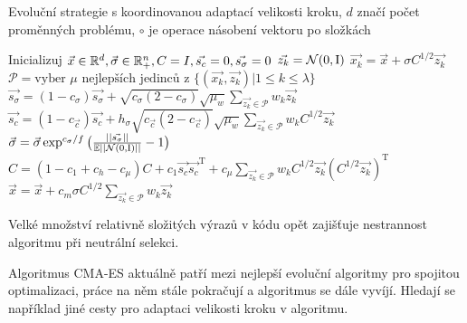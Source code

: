 \begin{algorithm}
\caption{Evoluční strategie s koordinovanou adaptací velikosti kroku, $d$ značí počet proměnných problému, $\circ$ je operace násobení vektoru po složkách}
\label{alg:CSA}
\begin{algorithmic}[1]
\State Inicializuj $\vec{x} \in {\ensuremath{\mathbb{R}}}^d, \vec{\sigma} \in {\ensuremath{\mathbb{R}}}^n_+, C = I, \vec{s_c} = 0, \vec{s_\sigma} = 0$
	  \State $\vec{z_k} = \mathcal{N}(0, \mathrm{I})$
	  \State $\vec{x_k} = \vec{x} + \sigma C^{1/2}\vec{z_k}$ 
	\EndFor
	\State $\mathcal{P} = \text{vyber } \mu \text{ nejlepších jedinců z } \{(\vec{x_k}, \vec{z_k}) | 1 \leq k \leq \lambda\}$
	\State $\vec{s_\sigma} = (1 - c_\sigma)\vec{s_\sigma} + \sqrt{c_\sigma(2-c_\sigma)}\sqrt{\mu_w}\sum_{\vec{z_k} \in \mathcal{P}}w_k\vec{z_k} $ 
	\State $\vec{s_c} = (1-c_{\vec{c}})\vec{s_c} + h_\sigma\sqrt{c_{\vec{c}}(2-c_{\vec{c}})}\sqrt{\mu_w}\sum_{\vec{z_k} \in \mathcal{P}}w_kC^{1/2}\vec{z_k}$
	\State $\vec{\sigma} = \vec{\sigma} \exp^{c_\sigma/f}\big(\frac{||\vec{s_\sigma}||}{\mathbb{E}||\mathcal{N}(0, \mathrm{I})||} - 1 \big)$
	\State $C = (1-c_1+c_h-c_\mu)C + c_1\vec{s_c}\vec{s_c}^\mathrm{T}+c_\mu\sum_{\vec{z_k} \in \mathcal{P}}w_kC^{1/2}\vec{z_k}(C^{1/2}\vec{z_k})^\mathrm{T}$
	\State $\vec{x} = \vec{x} + c_m \sigma C^{1/2} \sum_{\vec{z_k}\in\mathcal{P}}w_k\vec{z_k}$ 
\EndWhile
\EndProcedure
\end{algorithmic}
\end{algorithm}

Velké množství relativně složitých výrazů v kódu opět zajišťuje nestrannost algoritmu při neutrální selekci.

Algoritmus CMA-ES aktuálně patří mezi nejlepší evoluční algoritmy pro spojitou optimalizaci, práce na něm stále pokračují a algoritmus se dále vyvíjí. Hledají se například jiné cesty pro adaptaci velikosti kroku v algoritmu. 